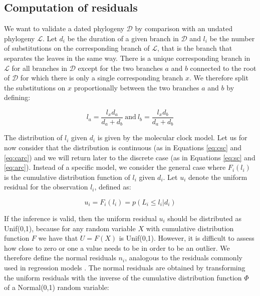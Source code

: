 \documentclass{article}
\begin{document}
\subsection*{Computation of residuals}

We want to validate a dated phylogeny $\mathcal{D}$ by comparison with an undated phylogeny $\mathcal{L}$. 
Let $d_i$ be the duration of a given branch in $\mathcal{D}$ and $l_i$ be the number of substitutions on the corresponding branch of $\mathcal{L}$, that is the branch that separates the leaves in the same way. There is a unique corresponding branch in $\mathcal{L}$ for all branches in $\mathcal{D}$ except for the two branches $a$ and $b$ connected to the root of $\mathcal{D}$ for which there is only a single corresponding branch $x$. We therefore split the substitutions on $x$ proportionally between the two branches $a$ and $b$ by defining:

\begin{equation}
l_a = \frac{l_x d_a}{d_a+d_b}\mathrm{~and~}l_b = \frac{l_x d_b}{d_a+d_b}
\end{equation}

The distribution of $l_i$ given $d_i$ is given by the molecular clock model. 
Let us for now consider that the distribution
is continuous (as in Equations \ref{eq:csc} and \ref{eq:carc}) and we will return later to the discrete case 
(as in Equations \ref{eq:sc} and \ref{eq:arc}). 
Instead of a specific model, we consider the general case where
$F_i(l_i)$ is the cumulative distribution function of $l_i$ given $d_i$.
Let $u_i$ denote the uniform residual for the observation $l_i$, defined as:

\begin{equation}
u_i=F_i(l_i)=p(L_i\leq l_i|d_i)
\label{eq:unif-resid}
\end{equation}

If the inference is valid, then the uniform residual $u_i$ 
should be distributed as Unif(0,1), because for any random variable $X$ with cumulative distribution function $F$ we have that $U=F(X)$ is Unif(0,1). 
However, it is difficult to assess how close to zero or one a value needs to be in order to be 
an outlier. 
We therefore define the normal residuals $n_i$, analogous to the residuals commonly used in 
regression models \citep{coxGeneralDefinitionResiduals1968,dunnRandomizedQuantileResiduals1996}. 
The normal residuals are obtained 
by transforming the uniform residuals with the inverse of the cumulative distribution function $\Phi$ 
of a Normal(0,1) random variable:
\end{document}
